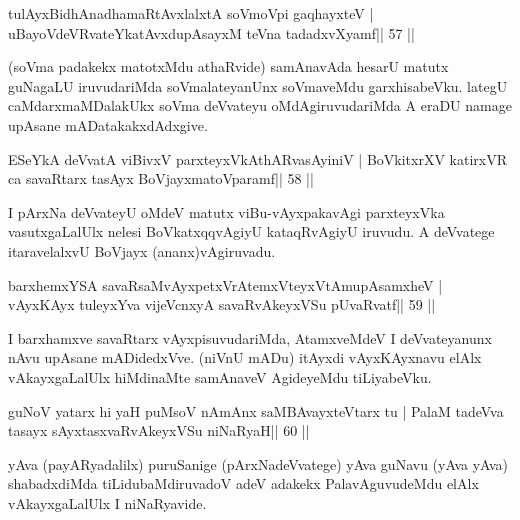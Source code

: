 \begin{shl}
tulAyxBidhAnadhamaRtAvxlalxtA soVmoV\s pi gaqhayxteV |
uBayoVdeVRvateYkatAvxdupAsayxM teVna tadadxvXyamf\hfill || 57 ||
\end{shl}

\begin{artha}
(soVma padakekx matotxMdu athaRvide) samAnavAda hesarU matutx guNagaLU  iruvudariMda soVmalateyanUnx soVmaveMdu garxhisabeVku. lategU  caMdarxmaMDalakUkx soVma deVvateyu oMdAgiruvudariMda A eraDU namage upAsane mADatakakxdAdxgive.
\end{artha}

\begin{shl}
ESeYkA deVvatA viBivxV parxteyxVkAthARvasAyiniV |
BoVkitxrXV katirxVR ca savaRtarx tasAyx BoVjayxmatoV\s paramf\hfill || 58 ||
\end{shl}

\begin{artha}
I pArxNa deVvateyU oMdeV matutx viBu-vAyxpakavAgi parxteyxVka  vasutxgaLalUlx nelesi BoVkatxqqvAgiyU kataqRvAgiyU iruvudu. A deVvatege itaravelalxvU BoVjayx (ananx)vAgiruvadu.
\end{artha}

\begin{shl}
barxhemxYSA savaRsaMvAyxpetxVrAtemxVteyxVtAmupAsamxheV |
vAyxKAyx tuleyxYva vijeVcnxyA savaRvAkeyxVSu pUvaRvatf\hfill || 59 ||
\end{shl}

\begin{artha}
I barxhamxve savaRtarx vAyxpisuvudariMda, AtamxveMdeV I deVvateyanunx nAvu upAsane mADidedxVve. (niVnU mADu) itAyxdi vAyxKAyxnavu elAlx vAkayxgaLalUlx hiMdinaMte samAnaveV AgideyeMdu tiLiyabeVku.
\end{artha}


\begin{shl}
guNoV yatarx hi yaH puMsoV nAmAnx saMBAvayxteV\s tarx tu |
PalaM tadeVva tasayx sAyxtasxvaRvAkeyxVSu niNaRyaH\hfill || 60 ||
\end{shl}

\begin{artha}
yAva (payARyadalilx) puruSanige (pArxNadeVvatege) yAva guNavu (yAva yAva) shabadxdiMda tiLidubaMdiruvadoV adeV adakekx PalavAguvudeMdu elAlx vAkayxgaLalUlx I niNaRyavide.
\end{artha}


